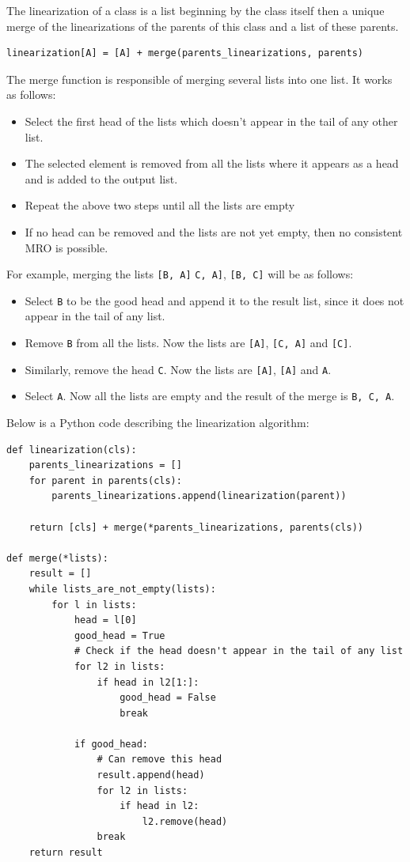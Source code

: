 The linearization of a class is a list beginning by the class itself then a unique merge of the linearizations of the parents of this class and a list of these parents.

\begin{lstlisting}
linearization[A] = [A] + merge(parents_linearizations, parents)
\end{lstlisting}

The merge function is responsible of merging several lists into one list. It works as follows:

\begin{itemize}
	\item Select the first head of the lists which doesn't appear in the tail of any other list.
	\item The selected element is removed from all the lists where it appears as a head and is added to the output list.
	\item Repeat the above two steps until all the lists are empty
	\item If no head can be removed and the lists are not yet empty, then no consistent MRO is possible.
\end{itemize}

For example, merging the lists \lstinline|[B, A]| \lstinline|C, A]|, \lstinline|[B, C]| will be as follows:
\begin{itemize}
	\item Select \lstinline|B| to be the good head and append it to the result list, since it does not appear in the tail of any list.
	\item Remove \lstinline|B| from all the lists. Now the lists are \lstinline|[A]|, \lstinline|[C, A]| and \lstinline|[C]|.
	\item Similarly, remove the head \lstinline|C|. Now the lists are \lstinline|[A]|, \lstinline|[A]| and \lstinline|A|.
	\item Select \lstinline|A|. Now all the lists are empty and the result of the merge is \lstinline|B, C, A|.
\end{itemize}

Below is a Python code describing the linearization algorithm:

\begin{lstlisting}
def linearization(cls):
	parents_linearizations = []
	for parent in parents(cls):
		parents_linearizations.append(linearization(parent))
	
	return [cls] + merge(*parents_linearizations, parents(cls))
	
def merge(*lists):
	result = []
	while lists_are_not_empty(lists):
		for l in lists:
			head = l[0]
			good_head = True
			# Check if the head doesn't appear in the tail of any list
			for l2 in lists:
				if head in l2[1:]:
					good_head = False
					break
			
			if good_head:
				# Can remove this head
				result.append(head)
				for l2 in lists:
					if head in l2:
						l2.remove(head)
				break
	return result		
\end{lstlisting}

